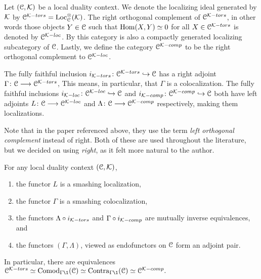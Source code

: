 \begin{construction}
    Let $(\EuScript{C}, \mathcal{K})$ be a local duality context. We denote the localizing ideal generated by $\mathcal{K}$ by $\EuScript{C}^{\mathcal{K}-tors} = \operatorname{Loc}_{\EuScript{C}}^\otimes(\mathcal{K})$. The right orthogonal complement of $\EuScript{C}^{\mathcal{K}-tors}$, in other words those objects $Y\in \EuScript{C}$ such that $\operatorname{Hom}(X, Y) \simeq 0$ for all $X\in \EuScript{C}^{\mathcal{K}-tors}$ is denoted by $\EuScript{C}^{\mathcal{K}-loc}$. By \cite[2.17]{barthel-heard-valenzuela_2018} this category is also a compactly generated localizing subcategory of $\EuScript{C}$. Lastly, we define the category $\EuScript{C}^{\mathcal{K}-comp}$ to be the right orthogonal complement to $\EuScript{C}^{\mathcal{K}-loc}$. 

    The fully faithful inclusion $i_{\mathcal{K}-tors}\colon\EuScript{C}^{\mathcal{K}-tors}\hookrightarrow \EuScript{C}$ has a right adjoint $\Gamma \colon\EuScript{C}\longrightarrow \EuScript{C}^{\mathcal{K}-tors}$, This means, in particular, that $\Gamma$ is a colocalization. The fully faithful inclusions $i_{\mathcal{K}-loc}\colon\EuScript{C}^{\mathcal{K}-loc}\hookrightarrow \EuScript{C}$ and $i_{\mathcal{K}-comp}\colon\EuScript{C}^{\mathcal{K}-comp}\hookrightarrow \EuScript{C}$ both have left adjoints $L\colon \EuScript{C}\longrightarrow \EuScript{C}^{\mathcal{K}-loc}$ and $\Lambda\colon\EuScript{C}\longrightarrow \EuScript{C}^{\mathcal{K}-comp}$ respectively, making them localizations. 
\end{construction}

\begin{remark}
    Note that in the paper \cite{barthel-heard-valenzuela_2018} referenced above, they use the term \emph{left orthogonal complement} instead of right. Both of these are used throughout the literature, but we decided on using \emph{right}, as it felt more natural to the author. 
\end{remark}

\begin{theorem}
    \label{ch2:thm:local-duality-co-contra}
    For any local duality context $(\EuScript{C}, \mathcal{K})$, 
    \begin{enumerate}
        \item the functor $L$ is a smashing localization,
        \item the functor $\Gamma$ is a smashing colocalization,
        \item the functors $\Lambda\circ i_{\mathcal{K}-tors}$ and $\Gamma \circ i_{\mathcal{K}-comp}$ are mutually inverse equivalences, and 
        \item the functors $(\Gamma, \Lambda)$, viewed as endofunctors on $\EuScript{C}$ form an adjoint pair. 
    \end{enumerate} 
    In particular, there are equivalences $\C^{\K-tors}\simeq \Comod_{\Gamma \1}(\C)\simeq \Contra_{\Gamma \1}(\C) \simeq \C^{\K-comp}.$
\end{theorem}

